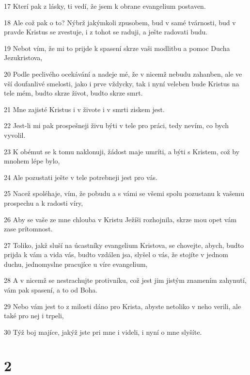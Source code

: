 \par 17 Kterí pak z lásky, ti vedí, že jsem k obrane evangelium postaven.
\par 18 Ale což pak o to? Nýbrž jakýmkoli zpusobem, bud v samé tvárnosti, bud v pravde Kristus se zvestuje, i z tohot se raduji, a ješte radovati budu.
\par 19 Nebot vím, že mi to prijde k spasení skrze vaši modlitbu a pomoc Ducha Jezukristova,
\par 20 Podle peclivého ocekávání a nadeje mé, že v nicemž nebudu zahanben, ale ve vší doufanlivé smelosti, jako i prve vždycky, tak i nyní veleben bude Kristus na tele mém, budto skrze život, budto skrze smrt.
\par 21 Mne zajisté Kristus i v živote i v smrti ziskem jest.
\par 22 Jest-li mi pak prospešneji živu býti v tele pro práci, tedy nevím, co bych vyvolil.
\par 23 K obémut se k tomu naklonuji, žádost maje umríti, a býti s Kristem, což by mnohem lépe bylo,
\par 24 Ale pozustati ješte v tele potrebneji jest pro vás.
\par 25 Nacež spoléhaje, vím, že pobudu a s vámi se všemi spolu pozustanu k vašemu prospechu a k radosti víry,
\par 26 Aby se vaše ze mne chlouba v Kristu Ježíši rozhojnila, skrze mou opet vám zase prítomnost.
\par 27 Toliko, jakž sluší na úcastníky evangelium Kristova, se chovejte, abych, budto prijda k vám a vida vás, budto vzdálen jsa, slyšel o vás, že stojíte v jednom duchu, jednomyslne pracujíce u víre evangelium,
\par 28 A v nicemž se nestrachujte protivníku, což jest jim jistým znamením zahynutí, vám pak spasení, a to od Boha.
\par 29 Nebo vám jest to z milosti dáno pro Krista, abyste netoliko v neho verili, ale také pro nej i trpeli,
\par 30 Týž boj majíce, jakýž jste pri mne i videli, i nyní o mne slyšíte.

\chapter{2}

